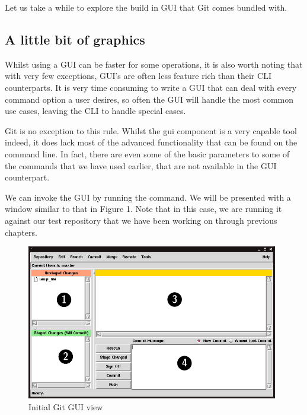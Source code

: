 Let us take a while to explore the build in GUI that Git comes bundled with.

\subsection{A little bit of graphics}
Whilst using a GUI can be faster for some operations, it is also worth noting that with very few exceptions, GUI's are often less feature rich than their CLI counterparts.  It is very time consuming to write a GUI that can deal with every command option a user desires, so often the GUI will handle the most common use cases, leaving the CLI to handle special cases.

Git is no exception to this rule.  Whilst the gui component is a very capable tool indeed, it does lack most of the advanced functionality that can be found on the command line.  In fact, there are even some of the basic parameters to some of the commands that we have used earlier, that are not available in the GUI counterpart.

We can invoke the GUI by running the  command.  We will be presented with a window similar to that in Figure 1.  Note that in this case, we are running it against our test repository that we have been working on through previous chapters.

\begin{figure}[hbt]
\centering
\includegraphics[width=11cm]{images/f-w5-d1.png}
\caption{Initial Git GUI view}
\end{figure}

